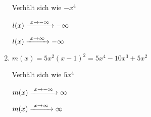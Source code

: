 \begin{Answer}[ref=ganzVerA1]
\begin{minipage}{\textwidth}
\begin{minipage}[t]{0.5\textwidth}
\begin{enumerate}[label=\alph*)]
				Verhält sich wie \(-x^4\)
				
				\(l(x)\xrightarrow{\hphantom{\ }x\to-\infty\hphantom{\ }}-\infty\)
				
				\(l(x)\xrightarrow{\hphantom{\ }x\to\infty\hphantom{\ }}-\infty\)
				\item \(m(x)=5x^2\left(x-1\right)^2=5x^4-10x^3+5x^2\)
				
				Verhält sich wie \(5x^4\)
				
				\(m(x)\xrightarrow{\hphantom{\ }x\to-\infty\hphantom{\ }}\infty\)
				
				\(m(x)\xrightarrow{\hphantom{\ }x\to\infty\hphantom{\ }}\infty\)
			\end{enumerate}
		\end{minipage}%
	\end{minipage}
\end{Answer}